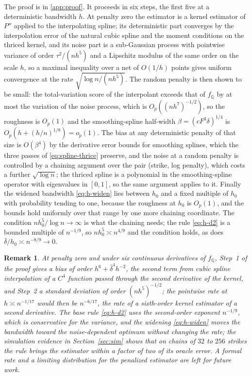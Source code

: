 \documentclass[preprint,12pt,authoryear,times]{elsarticle}
\newtheorem{remark}{Remark}
\newcommand{\Q}{\mathbb{Q}}
\begin{document}
The proof is in \ref{app:proof}. It proceeds in six steps, the first five at a deterministic bandwidth \(h\). At penalty zero the estimator is a kernel estimator of \(P''\) applied to the interpolating spline; its deterministic part converges by the interpolation error of the natural cubic spline and the moment conditions on the thriced kernel, and its noise part is a sub-Gaussian process with pointwise variance of order \(\tau^2/(nh^5)\) and a Lipschitz modulus of the same order on the scale \(h\), so a maximal inequality over a net of \(O(1/h)\) points gives uniform convergence at the rate \(\sqrt{\log n/(nh^5)}\). The random penalty is then shown to be small: the total-variation score of the interpolant exceeds that of \(f_{\Q}\) by at most the variation of the noise process, which is \(O_p((nh^7)^{-1/2})\), so the roughness is \(O_p(1)\) and the smoothing-spline half-width \(\beta=(cF^3\delta)^{1/4}\) is \(O_p(h+(h/n)^{1/8})=o_p(1)\). The bias at any deterministic penalty of that size is \(O(\beta^4)\) by the derivative error bounds for smoothing splines, which the three passes of \eqref{eq:spline-thrice} preserve, and the noise at a random penalty is controlled by a chaining argument over the pair (strike, log penalty), which costs a further \(\sqrt{\log n}\); the thriced spline is a polynomial in the smoothing-spline operator with eigenvalues in \([0,1]\), so the same argument applies to it. Finally the widened bandwidth \eqref{eq:h-widen} lies between \(h_0\) and a fixed multiple of \(h_0\) with probability tending to one, because the roughness at \(h_0\) is \(O_p(1)\), and the bounds hold uniformly over that range by one more chaining coordinate. The condition \(nh_0^5/\log n\to\infty\) is what the chaining needs; the rule \eqref{eq:h-d2} is a bounded multiple of \(n^{-1/9}\), so \(nh_0^5\asymp n^{4/9}\) and the condition holds, as does \(\bar\delta/h_0\asymp n^{-8/9}\to 0\).

\begin{remark}
\label{rem:rate}
At penalty zero and under six continuous derivatives of \(f_{\Q}\), Step~1 of the proof gives a bias of order \(h^6+\bar\delta^4h^{-2}\), the second term from cubic spline interpolation of a \(C^4\) function passed through the second derivative of the kernel, and Step~2 a standard deviation of order \((nh^5)^{-1/2}\); the pointwise rate at \(h\asymp n^{-1/17}\) would then be \(n^{-6/17}\), the rate of a sixth-order kernel estimator of a second derivative. The base rule \eqref{eq:h-d2} uses the second-order exponent \(n^{-1/9}\), which is conservative for the variance, and the widening \eqref{eq:h-widen} moves the bandwidth toward the noise-dependent optimum without changing the rate; the simulation evidence in Section~\ref{sec:sim} shows that on chains of \(32\) to \(256\) strikes the rule brings the estimator within a factor of two of its oracle error. A formal rate and a limiting distribution for the penalized estimator are left for future work.
\end{remark}
\end{document}
